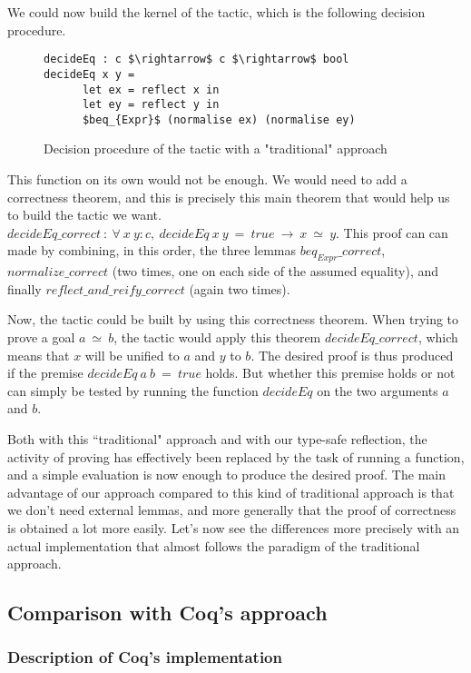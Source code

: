 We could now build the kernel of the tactic, which is the following decision procedure. 
\begin{figure}[H]
\figrule
\begin{center}
\begin{lstlisting}
decideEq : c $\rightarrow$ c $\rightarrow$ bool 
decideEq x y =
      let ex = reflect x in 
      let ey = reflect y in
      $beq_{Expr}$ (normalise ex) (normalise ey)
\end{lstlisting}
\end{center}
\caption{Decision procedure of the tactic with a "traditional" approach}
\label{decideEqTrad}
\figrule
\end{figure}
This function on its own would not  be enough. We would need to add a correctness theorem, and this is precisely this main theorem that would help us to build the tactic we want.	
$decideEq\_correct\ :\ \forall\  x\ y:c,\ decideEq\ x\ y\ =\ true\ \rightarrow\ x\  \simeq\ y$. This proof can can made by combining, in this order, the three lemmas $beq_{Expr}\_correct$, $normalize\_correct$ (two times, one on each side of the assumed equality), and finally $reflect\_and\_reify\_correct$ (again two times).

Now, the tactic could be built by using this correctness theorem. When trying to prove a goal $a\ \simeq \ b$, the tactic would apply this theorem $decideEq\_correct$, which means that $x$ will be unified to $a$ and $y$ to $b$. The desired proof is thus produced if the premise $decideEq\ a\ b\ =\ true$ holds. But whether this premise holds or not can simply be tested by running the function $decideEq$ on the two arguments $a$ and $b$. 

Both with this ``traditional" approach and with our type-safe reflection, the activity of proving has effectively been replaced by the task of running a function, and a simple evaluation is now enough to produce the desired proof. The main advantage of our approach compared to this kind of traditional approach is that we don't need external lemmas, and more generally that the proof of correctness is obtained a lot more easily. Let's now see the differences more precisely with an actual implementation that almost follows the paradigm of the traditional approach.

	\subsection {Comparison with Coq's approach}
	
		\subsubsection{Description of Coq's implementation}	
	

